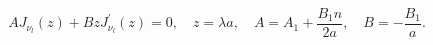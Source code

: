 \begin{equation}
AJ_{\nu _{l} }(z)+BzJ_{\nu _{l} }^{\prime }(z)=0,\quad z=\lambda
a,\quad A=A_{1}+ \frac{B_{1} n}{2a},\quad B=-\frac{B_{1}}{a}.
\label{eigenmodes}
\end{equation}

